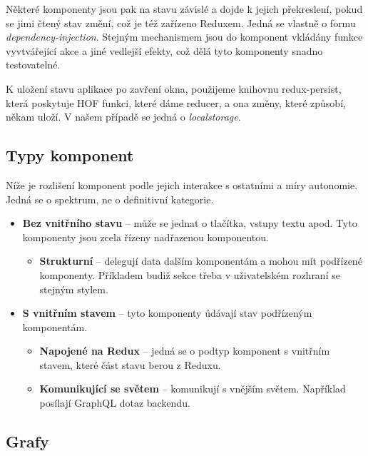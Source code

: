 Některé komponenty jsou pak na stavu závislé a dojde k jejich překreslení, pokud se jimi čtený stav změní, což je též zařízeno
Reduxem. Jedná se vlastně o formu \textit{dependency-injection}. Stejným mechanismem jsou do komponent vkládány
funkce vyvtvářející akce a jiné vedlejší efekty, což dělá tyto komponenty snadno testovatelné.

K uložení stavu aplikace po zavření okna, použijeme knihovnu redux-persist, která poskytuje
HOF funkci, které dáme reducer, a ona změny, které způsobí, někam uloží. \citep[viz][]{reduxpersist}
V našem případě se jedná o \textit{localstorage}.

\subsection{Typy komponent}

\noindent
Níže je rozlišení komponent podle jejich interakce s ostatními a míry autonomie.
Jedná se o spektrum, ne o definitivní kategorie.

\begin{itemize}
  \setlength\itemsep{0.05em}
  \item \textbf{Bez vnitřního stavu} -- může se jednat o tlačítka, vstupy textu apod. Tyto komponenty jsou zcela řízeny
      nadřazenou komponentou.
  \begin{itemize}
    \setlength\itemsep{0.05em}
    \item \textbf{Strukturní} -- delegují data dalším komponentám a mohou mít podřízené komponenty. Příkladem budiž sekce třeba v 
        uživatelském rozhraní se stejným stylem.
  \end{itemize}
  \item \textbf{S vnitřním stavem} -- tyto komponenty údávají stav podřízeným komponentám.
  \begin{itemize}
    \setlength\itemsep{0.05em}
    \item \textbf{Napojené na Redux} -- jedná se o podtyp komponent s vnitřním stavem, které část stavu berou z Reduxu.
    \item \textbf{Komunikující se světem} --  komunikují s vnějším světem. Například posílají GraphQL dotaz backendu.
  \end{itemize}
\end{itemize}

\subsection{Grafy}

